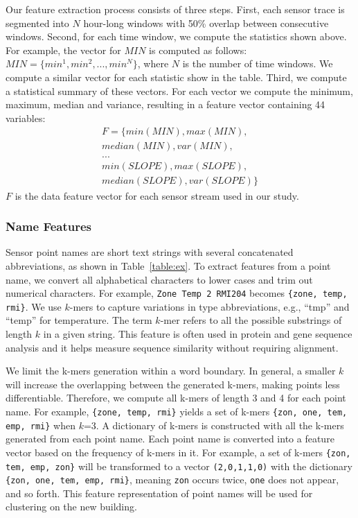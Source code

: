 Our feature extraction process consists of three steps.
First, each sensor trace is segmented into $N$ hour-long windows with 50\% overlap between consecutive windows. Second, for each time window, we compute the statistics shown above.
For example, the vector for $MIN$ is computed as follows:
$MIN = \{min^{1}, min^{2}, ..., min^{N}\}$, where $N$ is the number of time windows. We compute a similar vector for each statistic show in the table.
Third, we compute a statistical summary of these vectors. For each vector we compute the minimum, maximum, median and variance, resulting in a feature
vector containing 44 variables:
\begin{displaymath}
\begin{split}
F = \{min(MIN), max(MIN), \\
median(MIN), var(MIN),\\
...\\
min(SLOPE), max(SLOPE), \\
median(SLOPE), var(SLOPE)\}
\end{split}
\end{displaymath}
$F$ is the data feature vector for each sensor stream used in our study.

\subsubsection{Name Features}
Sensor point names are short text strings with several concatenated abbreviations, as shown in Table~\ref{table:ex}.
To extract features from a point name, we convert all alphabetical characters to lower cases and trim out numerical characters.
For example, \texttt{Zone Temp 2 RMI204} becomes \texttt{\{zone, temp, rmi\}}.
We use $k$-mers \cite{leslie2004mismatch} to capture variations in type abbreviations, e.g., ``tmp'' and ``temp'' for temperature.
The term $k$-mer refers to all the possible substrings of length $k$ in a given string. This feature is often used in protein and gene sequence analysis and
it helps measure sequence similarity without requiring alignment.

We limit the k-mers generation within a word boundary.
In general, a smaller $k$ will increase the overlapping between the generated k-mers, making points less differentiable.
Therefore, we compute all k-mers of length 3 and 4 for each point name.
For example, \texttt{\{zone, temp, rmi\}} yields a set of k-mers \texttt{\{zon, one, tem, emp, rmi\}} when $k$=3.
A dictionary of k-mers is constructed with all the k-mers generated from each point name.
Each point name is converted into a feature vector based on the frequency of k-mers in it.
For example, a set of k-mers \texttt{\{zon, tem, emp, zon\}} will be transformed to a vector
\texttt{(2,0,1,1,0)} with the dictionary \texttt{\{zon, one, tem, emp, rmi\}}, meaning \texttt{zon} occurs twice, \texttt{one} does
not appear, and so forth.
This feature representation of point names will be used for clustering on the new building.


